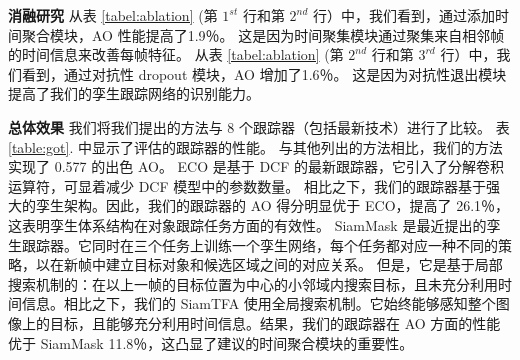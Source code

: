 \textbf{消融研究}
从表 \ref{tabel:ablation} (第 $1^{st}$ 行和第 $2^{nd}$ 行）中，我们看到，通过添加时间聚合模块，AO 性能提高了1.9％。
这是因为时间聚集模块通过聚集来自相邻帧的时间信息来改善每帧特征。
从表 \ref{tabel:ablation} (第 $2^{nd}$ 行和第 $3^{rd}$ 行）中，我们看到，通过对抗性 dropout 模块，AO 增加了1.6％。
这是因为对抗性退出模块提高了我们的孪生跟踪网络的识别能力。

\textbf{总体效果}
我们将我们提出的方法与 8 个跟踪器（包括最新技术）进行了比较。
表 \ref{table:got}.
中显示了评估的跟踪器的性能。
与其他列出的方法相比，我们的方法实现了 0.577 的出色 AO。
ECO \cite{danelljan2017eco} 是基于 DCF 的最新跟踪器，它引入了分解卷积运算符，可显着减少 DCF 模型中的参数数量。 相比之下，我们的跟踪器基于强大的孪生架构。因此，我们的跟踪器的 AO 得分明显优于 ECO，提高了 26.1％，这表明孪生体系结构在对象跟踪任务方面的有效性。
SiamMask \cite{Wang2018SiamMask} 是最近提出的孪生跟踪器。它同时在三个任务上训练一个孪生网络，每个任务都对应一种不同的策略，以在新帧中建立目标对象和候选区域之间的对应关系。
但是，它是基于局部搜索机制的：在以上一帧的目标位置为中心的小邻域内搜索目标，且未充分利用时间信息。相比之下，我们的 SiamTFA 使用全局搜索机制。它始终能够感知整个图像上的目标，且能够充分利用时间信息。结果，我们的跟踪器在 AO 方面的性能优于 SiamMask 11.8％，这凸显了建议的时间聚合模块的重要性。

